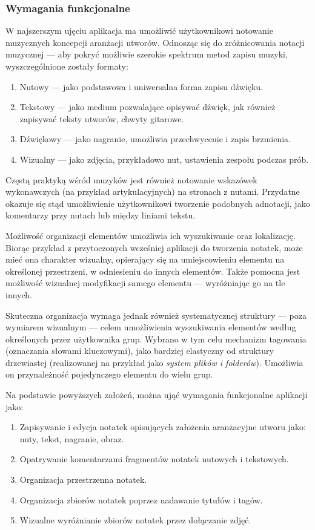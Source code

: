 \subsubsection{Wymagania funkcjonalne}
W najszerszym ujęciu aplikacja ma umożliwić użytkownikowi notowanie muzycznych koncepcji aranżacji utworów.
Odnosząc się do zróżnicowania notacji muzycznej — aby pokryć możliwie szerokie spektrum metod zapisu muzyki,
wyszczególnione zostały formaty:
\begin{enumerate}
	\item Nutowy — jako podstawowa i uniwersalna forma zapisu dźwięku.
	\item Tekstowy — jako medium pozwalające opisywać dźwięk, jak również zapisywać teksty utworów, chwyty gitarowe.
	\item Dźwiękowy — jako nagranie, umożliwia przechwycenie i zapis brzmienia.
	\item Wizualny — jako zdjęcia, przykładowo nut, ustawienia zespołu podczas prób.
\end{enumerate}

Częstą praktyką wśród muzyków jest również notowanie wskazówek wykonawczych (na przykład artykulacyjnych)
na stronach z nutami.
Przydatne okazuje się stąd umożliwienie użytkownikowi tworzenie podobnych adnotacji, jako komentarzy przy nutach
lub między liniami tekstu.

Możliwość organizacji elementów umożliwia ich wyszukiwanie oraz lokalizację.
Biorąc przykład z przytoczonych wcześniej aplikacji do tworzenia notatek, może mieć ona charakter wizualny,
opierający się na umiejscowieniu elementu na określonej przestrzeni, w odniesieniu do innych elementów.
Także pomocna jest możliwość wizualnej modyfikacji samego elementu — wyróżniając go na tle innych.

Skuteczna organizacja wymaga jednak również systematycznej struktury — poza wymiarem wizualnym — celem umożliwienia wyszukiwania
elementów według określonych przez użytkownika grup. Wybrano w tym celu mechanizm tagowania (oznaczania słowami kluczowymi), jako bardziej
elastyczny od struktury drzewiastej (realizowanej na przykład jako \textit{system plików i folderów}). Umożliwia on przynależność pojedynczego
elementu do wielu grup.

Na podstawie powyższych założeń, można ująć wymagania funkcjonalne aplikacji jako:
\begin{enumerate}
	\item Zapisywanie i edycja notatek opisujących założenia aranżacyjne utworu jako: nuty, tekst, nagranie, obraz.
	\item Opatrywanie komentarzami fragmentów notatek nutowych i tekstowych.
	\item Organizacja przestrzenna notatek.
	\item Organizacja zbiorów notatek poprzez nadawanie tytułów i tagów.
	\item Wizualne wyróżnianie zbiorów notatek przez dołączanie zdjęć.
\end{enumerate}

